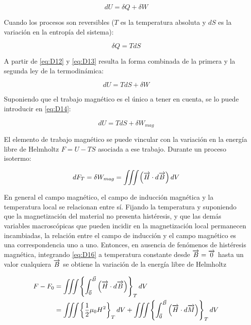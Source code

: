 \begin{equation}
	\label{eq:D12}
	 dU= \delta Q + \delta W
\end{equation}

Cuando los procesos son reversibles ($T$ es la temperatura absoluta y $dS$ es la variación en la entropía del sistema):

\begin{equation}
	\label{eq:D13}
	 \delta Q = T dS
\end{equation}

A partir de \ref{eq:D12} y \ref{eq:D13} resulta la forma combinada de la primera y la segunda ley de la termodinámica:

\begin{equation}
	\label{eq:D14}
	 dU= T dS + \delta W
\end{equation}

Suponiendo que el trabajo magnético es el único a tener en cuenta, se lo puede introducir en \ref{eq:D14}:

\begin{equation}
	\label{eq:D15}
	 dU= T dS + \delta W_{mag}
\end{equation}

El elemento de trabajo magnético se puede vincular con la variación en la energía libre de Helmholtz $F=U-TS$ asociada a ese trabajo. Durante un proceso isotermo:

\begin{equation}
	\label{eq:D16}
	 dF_{T}= \delta W_{mag} = \iiint \left( \overrightarrow{H} \cdot d\overrightarrow{B} \right) dV
\end{equation}

En general el campo magnético, el campo de inducción magnética y la temperatura local se relacionan entre sí. Fijando la temperatura y suponiendo que la magnetización del material no presenta histéresis, y que las demás variables macroscópicas que pueden incidir en la magnetización local permanecen incambiadas, la relación entre el campo de inducción y el campo magnético es una correspondencia uno a uno. Entonces, en ausencia de fenómenos de histéresis magnética, integrando \ref{eq:D16} a temperatura constante desde $\overrightarrow{B}=\overrightarrow{0}$ hasta un valor cualquiera $\overrightarrow{B}$ se obtiene la variación de la energía libre de Helmholtz \citep{Guggenheim1}

\begin{equation}
\begin{aligned}
	\label{eq:D17}
	 F-F_{0} &= \iiint\left\lbrace \int_{\vec{0}}^{\vec{B}} \left( \overrightarrow{H}\cdot d\overrightarrow{B} \right)  \right\rbrace_{T} dV \\
	 &= \iiint\left\lbrace \dfrac{1}{2}\mu_{0}H^{2} \right\rbrace_{T} dV +
\iiint\left\lbrace \int_{\vec{0}}^{\vec{B}} \left( \overrightarrow{H}\cdot d\overrightarrow{M} \right)  \right\rbrace_{T} dV 	 
\end{aligned}
\end{equation}

